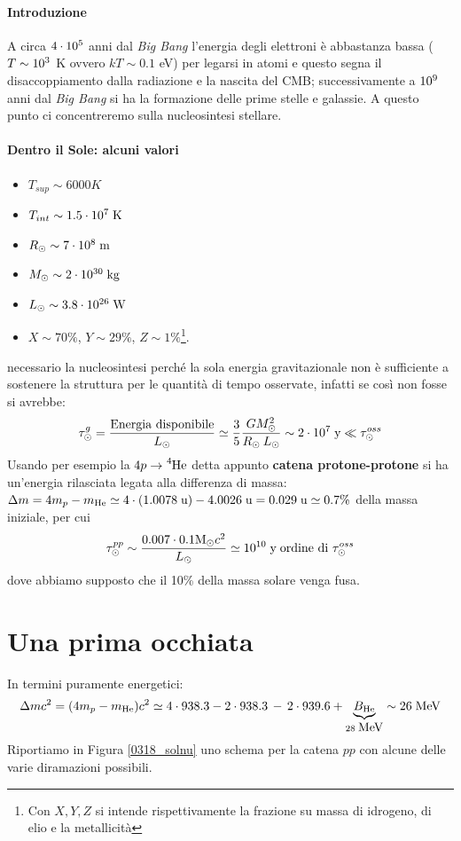 \paragraph{Introduzione} A circa $4\cdot10^{5}$ anni dal \textit{Big Bang} l'energia degli elettroni è abbastanza bassa ($T\sim10^{3}$ K ovvero $kT\sim0.1$ eV) per legarsi in atomi e questo segna il disaccoppiamento dalla radiazione e la nascita del CMB; successivamente a $10^{9}$ anni dal \textit{Big Bang} si ha la formazione delle prime stelle e galassie. A questo punto ci concentreremo sulla nucleosintesi stellare.

\paragraph{Dentro il Sole: alcuni valori}
\begin{itemize}
    \item $T_{sup}\sim 6000\unit{K}$
    \item $T_{int}\sim 1.5\cdot10^{7}\;\mbox{K}$
    \item $R_{\odot}\sim 7\cdot10^{8}\;\mbox{m}$
    \item $M_{\odot}\sim 2\cdot10^{30}\;\mbox{kg}$
    \item $L_{\odot}\sim 3.8\cdot10^{26}\;\mbox{W}$
    \item $X\sim 70\%$, $Y\sim 29\%$, $Z\sim 1\%$\footnote{Con $X,Y,Z$ si intende rispettivamente la frazione su massa di idrogeno, di elio e la metallicità}.
\end{itemize}
 necessario  la nucleosintesi perché la sola energia gravitazionale non è sufficiente a sostenere la struttura per le quantità di tempo osservate, infatti se così non fosse si avrebbe:
$$\tau_{\odot}^g = \frac{\text{Energia disponibile}}{L_{\odot}} \simeq \frac{3}{5}\frac{GM_{\odot}^2}{R_{\odot}\:L_{\odot} }\sim 2\cdot10^{7}\;\mbox{y}\ll\tau_{\odot}^{oss}$$
Usando per esempio la $4p\to\ce{^4He}$ detta appunto \textbf{catena protone-protone} si ha un'energia rilasciata legata alla differenza di massa: $\Delta m = 4m_p - m_{\ce{He}} \simeq 4\cdot(1.0078\unit{u})-4.0026\unit{u} = 0.029\unit{u}\simeq 0.7\%$ della massa iniziale, per cui
$$\tau_{\odot}^{pp}\sim\frac{0.007\cdot0.1\mbox{M}_{\odot} c^2}{L_{\odot}}\simeq 10^{10}\;\mbox{y} \;\text{ordine di } \tau_{\odot}^{oss}$$
dove abbiamo supposto che il 10\% della massa solare venga fusa.

\section{Una prima occhiata}
In termini puramente energetici:
$$\Delta m c^2 = (4m_p - m_{\ce{He}})c^2 \simeq 4\cdot 938.3 - 2\cdot 938.3 \,-\, 2\cdot 939.6 + \underbrace{B_{\ce{He}}}_{28\unit{MeV}} \sim 26\unit{MeV}$$
Riportiamo in Figura \ref{0318_solnu} uno schema per la catena $pp$ con alcune delle varie diramazioni possibili.


